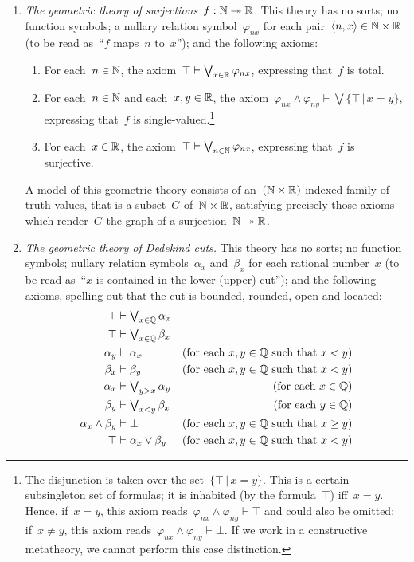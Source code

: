 \documentclass{ws-rv9x6}
\begin{document}
{\begin{enumerate}
\item\label{item:theory-of-surjections} \emph{The geometric theory of surjections~$f : \mathbb{N} \twoheadrightarrow
\mathbb{R}$.} This theory has no
sorts; no function symbols; a nullary relation symbol~$\varphi_{nx}$ for each
pair~$\langle n,x \rangle \in \mathbb{N} \times \mathbb{R}$ (to be read as~``$f$ maps~$n$
to~$x$''); and the following axioms:
\begin{enumerate}
\item For each~$n \in \mathbb{N}$, the axiom~$\top \vdash \bigvee_{x \in \mathbb{R}}
\varphi_{nx}$, expressing that~$f$ is total.
\item For each~$n \in \mathbb{N}$ and each~$x,y \in \mathbb{R}$, the axiom~$\varphi_{nx}
\wedge \varphi_{ny} \vdash \bigvee\{ \top \,|\, x = y \}$,
expressing that~$f$ is single-valued.\footnote{The disjunction is taken over
the set~$\{ \top \,|\, x = y \}$. This is a certain subsingleton set of
formulas; it is inhabited (by the formula~$\top$) iff~$x = y$. Hence, if~$x =
y$, this axiom reads~$\varphi_{nx}
\wedge \varphi_{ny} \vdash \top$ and could also be omitted; if~$x \neq y$,
this axiom reads~$\varphi_{nx} \wedge \varphi_{ny} \vdash \bot$. If we work in
a constructive metatheory, we cannot perform this case distinction.}
\item For each~$x \in \mathbb{R}$, the axiom~$\top \vdash \bigvee_{n \in \mathbb{N}}
\varphi_{nx}$, expressing that~$f$ is surjective.
\end{enumerate}

A model of this geometric theory consists of an~$(\mathbb{N} \times \mathbb{R})$-indexed
family of truth values, that is a subset~$G$ of~$\mathbb{N} \times \mathbb{R}$, satisfying
precisely those axioms which render~$G$ the graph of a surjection~$\mathbb{N}
\twoheadrightarrow \mathbb{R}$.

\item \emph{The geometric theory of Dedekind cuts.}\label{par:dedekind-cuts}
This theory has no sorts; no
function symbols; nullary relation symbols~$\alpha_x$ and~$\beta_x$ for each
rational number~$x$ (to be read as~``$x$ is contained in the lower (upper)
cut''); and the following axioms, spelling out that the cut is bounded,
rounded, open and located:
\begin{align*}
  \top &\vdash \textstyle\bigvee_{x \in \mathbb{Q}} \alpha_x \\
  \top &\vdash \textstyle\bigvee_{x \in \mathbb{Q}} \beta_x \\
  \alpha_y &\vdash \alpha_x & \text{(for each~$x,y \in \mathbb{Q}$ such that~$x < y$)} \\
  \beta_x &\vdash \beta_y & \text{(for each~$x,y \in \mathbb{Q}$ such that~$x < y$)} \\
  \alpha_x &\vdash \textstyle\bigvee_{y > x} \alpha_y & \text{(for each~$x \in \mathbb{Q}$)} \\
  \beta_y &\vdash \textstyle\bigvee_{x < y} \beta_x & \text{(for each~$y \in \mathbb{Q}$)} \\
  \alpha_x \wedge \beta_y &\vdash \bot & \text{(for each~$x,y \in \mathbb{Q}$ such that~$x \geq y$)} \\
  \top &\vdash \alpha_x \vee \beta_y & \text{(for each~$x,y \in \mathbb{Q}$ such that~$x < y$)}
\end{align*}


\end{enumerate}}
\end{document}

